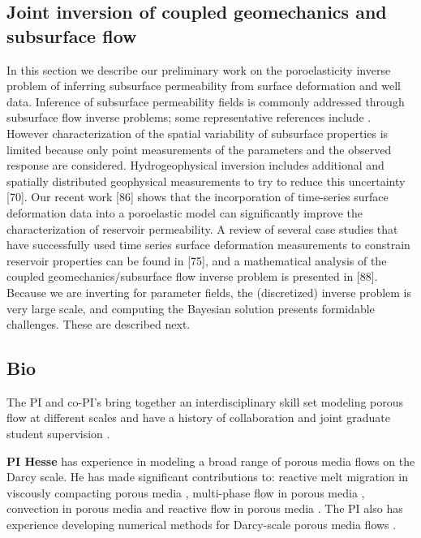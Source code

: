 \documentclass[11pt,final]{article}%
\renewcommand{\citep}{\cite}
\begin{document}
\subsection{Joint inversion of coupled geomechanics and subsurface flow}
In this section we describe our preliminary work on the poroelasticity inverse problem of inferring subsurface permeability from surface deformation and well data. Inference of subsurface permeability fields is commonly addressed through
subsurface flow inverse problems; some representative references include \citep{Carrera1986a,Carrera1986b,Carrera1986c,McLaughlin1996,Bohling2010,Cardiff2011,Cardiff2012,Berg2015,Yoon2017}. 
However characterization of the spatial variability of subsurface properties is limited because only point measurements of the parameters and the observed response are considered. Hydrogeophysical inversion includes additional and spatially distributed geophysical measurements to try to reduce this
uncertainty [70]. Our recent work [86] shows that the incorporation of time-series surface deformation data into a poroelastic model can significantly improve the characterization of reservoir permeability. A review of several case studies that have successfully used time series surface deformation measurements
to constrain reservoir properties can be found in [75], and a mathematical analysis of the coupled geomechanics/subsurface flow inverse problem is presented in [88]. Because we are inverting for parameter fields, the (discretized) inverse problem is very large scale, and computing the Bayesian solution presents formidable challenges. These are described next.

\subsection{Bio}
The PI and co-PI's bring together an interdisciplinary skill set modeling porous flow at different scales and have a history of collaboration and joint graduate student supervision \cite{Ghanbarzadeh2014,Ghanbarzadeh2015a,Ghanbarzadeh2015b,Ghanbarzadeh2017}.

\textbf{PI Hesse} has experience in modeling a broad range of porous media flows on the Darcy scale. He has made significant contributions to: reactive melt migration in viscously compacting porous media \cite{Hesse2003,Liang2010a,Liang2011b,Hesse2011,Schiemenz2011,Jordan2015,Arbogast2017,Jordan2018}, multi-phase flow in porous media \cite{Hesse2007,Hesse2008,Hesse2010,Golding2011,Sathaye2016b}, convection in porous media \cite{Riaz2006,Neufeld2010,MacMinn2012,Szulczewski2013a,Sathaye2014,Woods2015} and reactive flow in porous media \cite{Prigiobbe2012a,Prigiobbe2012b,Prigiobbe2013,Venkatraman2014,McNeece2016}. The PI also has experience developing numerical methods for Darcy-scale porous media flows \cite{Li2005,Hesse2008b,Schiemenz2011,Hesse2012,Hesse2014,Arbogast2017}.
\end{document}
